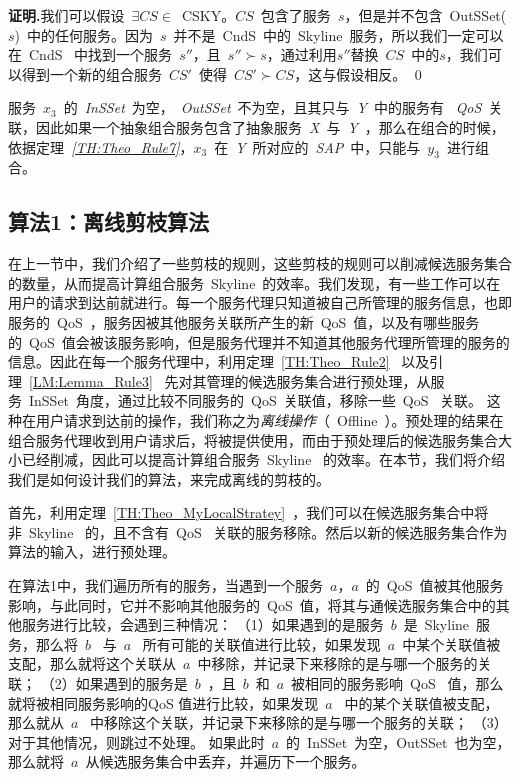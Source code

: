 \textbf{证明.}我们可以假设~$\exists CS \in$~CSKY。$CS$~包含了服务~$s$，但是并不包含~OutSSet($s$)~中的任何服务。因为~$s$~并不是~CndS~中的~Skyline~服务，所以我们一定可以在~CndS~ 中找到一个服务~$s''$，且~$s'' \succ s$，通过利用$s''$替换~$CS$~中的$s$，我们可以得到一个新的组合服务~$CS'$~使得~$CS' \succ CS$，这与假设相反。
\qed

\begin{example}
服务~$x_{3}$~的~\emph{InSSet}~为空，~\emph{OutSSet}~不为空，且其只与~\emph{Y}~中的服务有~ \emph{QoS}~关联，因此如果一个抽象组合服务包含了抽象服务~\emph{X}~与~\emph{Y}~，那么在组合的时候，依据定理\emph{~\ref{TH:Theo_Rule7}}，$x_{3}$~在~\emph{Y}~所对应的~\emph{SAP}~中，只能与~$y_{3}$~进行组合。
\end{example}

\subsection{算法1：离线剪枝算法}\label{S:SEC_ALGO1}

在上一节中，我们介绍了一些剪枝的规则，这些剪枝的规则可以削减候选服务集合的数量，从而提高计算组合服务~Skyline~的效率。我们发现，有一些工作可以在用户的请求到达前就进行。每一个服务代理只知道被自己所管理的服务信息，也即服务的~QoS~，服务因被其他服务关联所产生的新~QoS~值，以及有哪些服务的~QoS~值会被该服务影响，但是服务代理并不知道其他服务代理所管理的服务的信息。因此在每一个服务代理中，利用定理~\ref{TH:Theo_Rule2}~ 以及引理~\ref{LM:Lemma_Rule3}~ 先对其管理的候选服务集合进行预处理，从服务~InSSet~角度，通过比较不同服务的~QoS~关联值，移除一些~QoS~ 关联。 这种在用户请求到达前的操作，我们称之为\emph{离线操作}（~Offline~）。预处理的结果在组合服务代理收到用户请求后，将被提供使用，而由于预处理后的候选服务集合大小已经削减，因此可以提高计算组合服务~Skyline~ 的效率。在本节，我们将介绍我们是如何设计我们的算法，来完成离线的剪枝的。

首先，利用定理~\ref{TH:Theo_MyLocalStratey}~，我们可以在候选服务集合中将非~Skyline~ 的，且不含有~QoS~ 关联的服务移除。然后以新的候选服务集合作为算法的输入，进行预处理。

在算法1中，我们遍历所有的服务，当遇到一个服务~$a$，$a$~的~QoS~值被其他服务影响，与此同时，它并不影响其他服务的~QoS~值，将其与通候选服务集合中的其他服务进行比较，会遇到三种情况：
（1）如果遇到的是服务~$b$~是~Skyline~服务，那么将~$b$~ 与~$a$~ 所有可能的关联值进行比较，如果发现~$a$~中某个关联值被支配，那么就将这个关联从~$a$~中移除，并记录下来移除的是与哪一个服务的关联；
（2）如果遇到的服务是~$b$~，且~$b$~和~$a$~被相同的服务影响~QoS~ 值，那么就将被相同服务影响的QoS 值进行比较，如果发现~$a$~ 中的某个关联值被支配，那么就从~$a$~ 中移除这个关联，并记录下来移除的是与哪一个服务的关联；
（3）对于其他情况，则跳过不处理。
如果此时~$a$~的~InSSet~为空，OutSSet~也为空，那么就将~$a$~从候选服务集合中丢弃，并遍历下一个服务。

